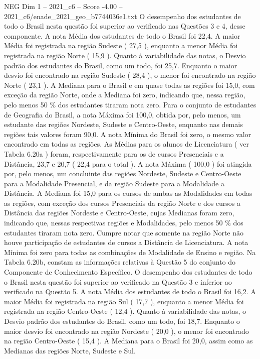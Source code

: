 \begin{textsample}{NEG Dim 1 – 2021\_c6 – Score -4.00 – 2021\_c6/enade\_2021\_geo\_b7744036e1.txt}
O desempenho dos estudantes de todo o Brasil nesta questão foi superior ao verificado nas Questões 3 e 4, desse componente.
A nota Média dos estudantes de todo o Brasil foi 22,4.
A maior Média foi registrada na região Sudeste ( 27,5 ), enquanto a menor Média foi registrada na região Norte ( 15,9 ).
Quanto à variabilidade das notas, o Desvio padrão dos estudantes do Brasil, como um todo, foi 25,7.
Enquanto o maior desvio foi encontrado na região Sudeste ( 28,4 ), o menor foi encontrado na região Norte ( 23,1 ).
A Mediana para o Brasil e em quase todas as regiões foi 15,0, com exceção da região Norte, onde a Mediana foi zero, indicando que, nessa região, pelo menos 50 \% dos estudantes tiraram nota zero.
Para o conjunto de estudantes de Geografia do Brasil, a nota Máxima foi 100,0, obtida por, pelo menos, um estudante das regiões Nordeste, Sudeste e Centro-Oeste, enquanto nas demais regiões tais valores foram 90,0.
A nota Mínima do Brasil foi zero, o mesmo valor encontrado em todas as regiões.
As Médias para os alunos de Licenciatura ( ver Tabela 6.20a ) foram, respectivamente para os de cursos Presenciais e a Distância, 23,7 e 20,7 ( 22,4 para o total ).
A nota Máxima ( 100,0 ) foi atingida por, pelo menos, um concluinte das regiões Nordeste, Sudeste e Centro-Oeste para a Modalidade Presencial, e da região Sudeste para a Modalidade a Distância.
A Mediana foi 15,0 para os cursos de ambas as Modalidades em todas as regiões, com exceção dos cursos Presenciais da região Norte e dos cursos a Distância das regiões Nordeste e Centro-Oeste, cujas Medianas foram zero, indicando que, nessas respectivas regiões e Modalidades, pelo menos 50 \% dos estudantes tiraram nota zero.
Cumpre notar que somente na região Norte não houve participação de estudantes de cursos a Distância de Licenciatura.
A nota Mínima foi zero para todas as combinações de Modalidade de Ensino e região.
Na Tabela 6.20b, constam as informações relativas à Questão 5 do conjunto do Componente de Conhecimento Específico.
O desempenho dos estudantes de todo o Brasil nesta questão foi superior ao verificado na Questão 3 e inferior ao verificado na Questão 5.
A nota Média dos estudantes de todo o Brasil foi 16,2.
A maior Média foi registrada na região Sul ( 17,7 ), enquanto a menor Média foi registrada na região Centro-Oeste ( 12,4 ).
Quanto à variabilidade das notas, o Desvio padrão dos estudantes do Brasil, como um todo, foi 18,7.
Enquanto o maior desvio foi encontrado na região Nordeste ( 20,0 ), o menor foi encontrado na região Centro-Oeste ( 15,4 ).
A Mediana para o Brasil foi 20,0, assim como as Medianas das regiões Norte, Sudeste e Sul.

\end{textsample}
